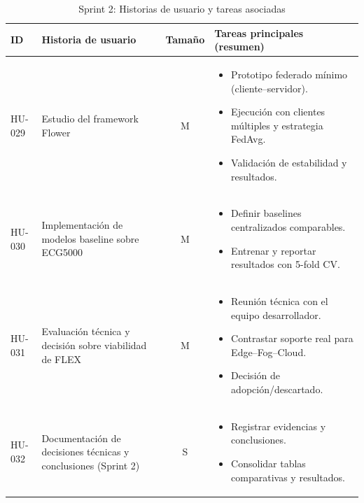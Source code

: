 \documentclass{report}
\begin{document}
\begin{table}[H]
\centering
\footnotesize
\caption{Sprint 2: Historias de usuario y tareas asociadas}
\label{tab:sprint2}
\renewcommand{\arraystretch}{1.25}
\setlength{\tabcolsep}{4pt}

\begin{tabular}{|l|p{4.6cm}|c|p{5.8cm}|}
\hline
\textbf{ID} & \textbf{Historia de usuario} & \textbf{Tamaño} & \textbf{Tareas principales (resumen)} \\ \hline

HU-029 &
Estudio del framework Flower &
M &
\begin{itemize}\setlength\itemsep{0.2em}
  \item Prototipo federado mínimo (cliente--servidor).
  \item Ejecución con clientes múltiples y estrategia FedAvg.
  \item Validación de estabilidad y resultados.
\end{itemize}
\\ \hline

HU-030 &
Implementación de modelos baseline sobre ECG5000 &
M &
\begin{itemize}\setlength\itemsep{0.2em}
  \item Definir baselines centralizados comparables.
  \item Entrenar y reportar resultados con 5-fold CV.
\end{itemize}
\\ \hline

HU-031 &
Evaluación técnica y decisión sobre viabilidad de FLEX &
M &
\begin{itemize}\setlength\itemsep{0.2em}
  \item Reunión técnica con el equipo desarrollador.
  \item Contrastar soporte real para Edge--Fog--Cloud.
  \item Decisión de adopción/descartado.
\end{itemize}
\\ \hline

HU-032 &
Documentación de decisiones técnicas y conclusiones (Sprint 2) &
S &
\begin{itemize}\setlength\itemsep{0.2em}
  \item Registrar evidencias y conclusiones.
  \item Consolidar tablas comparativas y resultados.
\end{itemize}
\\ \hline
\end{tabular}
\end{table}
\end{document}
